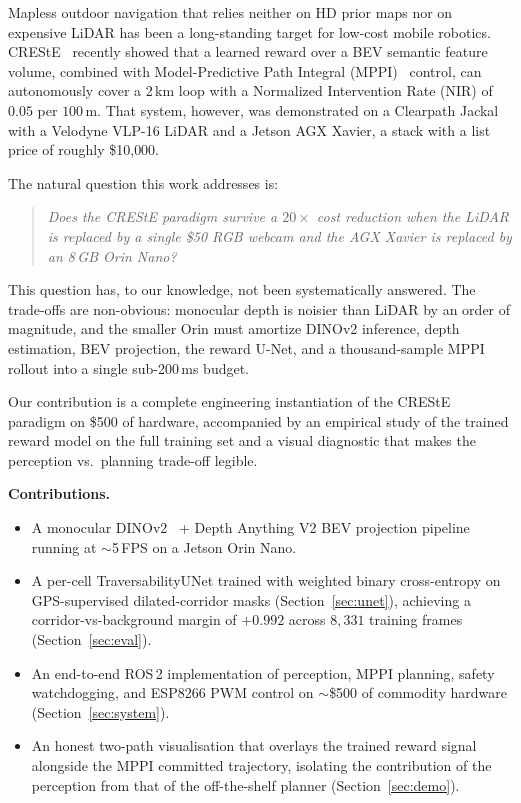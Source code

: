 \documentclass[conference]{IEEEtran}
\begin{document}
Mapless outdoor navigation that relies neither on HD prior maps nor on
expensive LiDAR has been a long-standing target for low-cost mobile
robotics. CREStE~\cite{creste} recently showed that a learned reward over a
BEV semantic feature volume, combined with Model-Predictive Path Integral
(MPPI)~\cite{mppi} control, can autonomously cover a 2\,km loop with a
Normalized Intervention Rate (NIR) of $0.05$ per $100$\,m. That system,
however, was demonstrated on a Clearpath Jackal with a Velodyne VLP-16 LiDAR
and a Jetson AGX Xavier, a stack with a list price of roughly \$10{,}000.

The natural question this work addresses is:
\begin{quote}
\textit{Does the CREStE paradigm survive a $20\times$ cost reduction when the
LiDAR is replaced by a single \$50 RGB webcam and the AGX Xavier is replaced
by an 8\,GB Orin Nano?}
\end{quote}
This question has, to our knowledge, not been systematically answered. The
trade-offs are non-obvious: monocular depth is noisier than LiDAR by an
order of magnitude, and the smaller Orin must amortize DINOv2 inference,
depth estimation, BEV projection, the reward U-Net, and a thousand-sample
MPPI rollout into a single sub-200\,ms budget.

Our contribution is a complete engineering instantiation of the CREStE
paradigm on \$500 of hardware, accompanied by an empirical study of the
trained reward model on the full training set and a visual diagnostic that
makes the perception vs.\ planning trade-off legible.

\medskip
\noindent\textbf{Contributions.}
\begin{itemize}
  \item A monocular DINOv2~\cite{dinov2} + Depth Anything V2 BEV projection
        pipeline running at $\sim$5\,FPS on a Jetson Orin Nano.
  \item A per-cell TraversabilityUNet trained with weighted binary
        cross-entropy on GPS-supervised dilated-corridor masks
        (Section~\ref{sec:unet}), achieving a corridor-vs-background
        margin of $+0.992$ across $8{,}331$ training frames
        (Section~\ref{sec:eval}).
  \item An end-to-end ROS\,2 implementation of perception, MPPI planning,
        safety watchdogging, and ESP8266 PWM control on $\sim$\$500 of
        commodity hardware (Section~\ref{sec:system}).
  \item An honest two-path visualisation that overlays the trained reward
        signal alongside the MPPI committed trajectory, isolating the
        contribution of the perception from that of the off-the-shelf
        planner (Section~\ref{sec:demo}).
\end{itemize}
\end{document}
